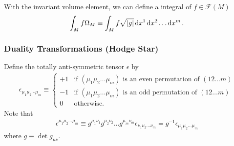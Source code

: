 \documentclass[10pt]{article}
\begin{document}
With the invariant volume element, we can define a integral of $f\in\mathcal{F}(M)$
\begin{align}
    \int_M f\Omega_M\equiv\int_M f\sqrt{\abs{g}}\dd{x^1}\dd{x^2}\dots\dd{x^m}.
\end{align}


\subsubsection{Duality Transformations (Hodge Star)}
Define the totally anti-symmetric tensor $\epsilon$ by
\begin{align}
    \epsilon_{\mu_1 \mu_2\cdots\mu_m}\equiv\begin{cases}
        +1 & \text{if $(\mu_1 \mu_2 \dots\mu_m)$ is an even permutation of $(12\dots m)$} \\
        -1 & \text{if $(\mu_1 \mu_2 \dots\mu_m)$ is an odd permutation of $(12\dots m)$}  \\
        0  & \text{otherwise}.
    \end{cases}
\end{align}
Note that
\begin{align}
    \epsilon^{\mu_1\mu_2 \dots\mu_m}\equiv g^{\mu_1\nu_1}g^{\mu_2\nu_2}\dots g^{\mu_m\nu_m}\epsilon_{\nu_1\nu_2\dots\nu_m}=g^{-1}\epsilon_{\mu_1\mu_2\dots\mu_m}
\end{align}
where $g\equiv\det g_{\mu\nu}$.
\end{document}
